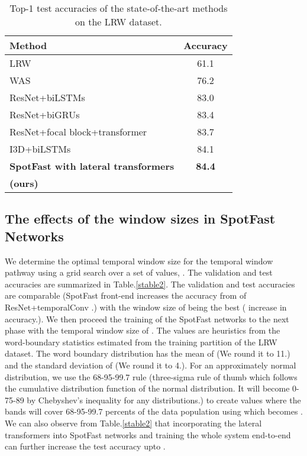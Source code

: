 \documentclass{article}
\begin{document}
\begin{table}[] \label{stable1}
\centering
\caption{Top-1 test accuracies of the state-of-the-art methods on the LRW dataset.}
\vspace{0.5\baselineskip}
\label{stable1}
\begin{tabular}{l|c}
\hline
 Method    & Accuracy  \\
\hline
 LRW \cite{chung2016lip} & 61.1  \\
WAS \cite{chung2017lip} & 76.2   \\
ResNet+biLSTMs \cite{stafylakis2017combining} & 83.0 \\
ResNet+biGRUs \cite{petridis2018end} & 83.4 \\
ResNet+focal block+transformer \cite{Zhang_2019_ICCV} & 83.7   \\ 
I3D+biLSTMs \cite{weng2019learning} & 84.1   \\ 
\hline
\textbf{SpotFast with lateral transformers} &  \textbf{84.4}  \\
\textbf{(ours)} & \\
\hline
\end{tabular}
\end{table}

\subsection{The effects of the window sizes in SpotFast Networks}
We determine the optimal temporal window size for the temporal window pathway using a grid search over a set of  values, . The validation and test accuracies are summarized in Table.\ref{stable2}. The validation and test accuracies are comparable (SpotFast front-end increases the accuracy from  of ResNet+temporalConv \cite{stafylakis2017combining}.) with the window size of  being the best ( increase in accuracy.). We then proceed the training of the SpotFast networks to the next phase with the temporal window size of . The  values are heuristics from the word-boundary statistics estimated from the training partition of the LRW dataset. The word boundary distribution has the mean of  (We round it to 11.) and the standard deviation of  (We round it to 4.). For an approximately normal distribution, we use the 68-95-99.7 rule (three-sigma rule of thumb which follows the cumulative distribution function of the normal distribution. It will become 0-75-89 by Chebyshev's inequality for any distributions.) to create  values where the bands will cover 68-95-99.7 percents of the data population using  which becomes . We can also observe from Table.\ref{stable2} that incorporating the lateral transformers into SpotFast networks and training the whole system end-to-end can further increase the test accuracy upto .
\end{document}
